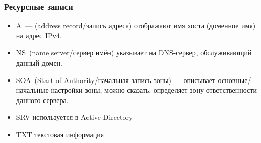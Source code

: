 \begin{frame}
    \frametitle{Ресурсные записи}
\begin{itemize}
    \item \alert{A} — (address record/запись адреса) отображают имя хоста (доменное имя) на адрес IPv4. 
    \item \alert{NS} (name server/сервер имён) указывает на DNS-сервер, обслуживающий данный домен. 
    \item \alert{SOA} (Start of Authority/начальная запись зоны) — описывает основные/начальные настройки зоны, можно сказать, определяет зону ответственности данного сервера. 
    \item \alert{SRV} используется в Active Directory
    \item \alert{TXT} текстовая информация
\end{itemize}


\end{frame}